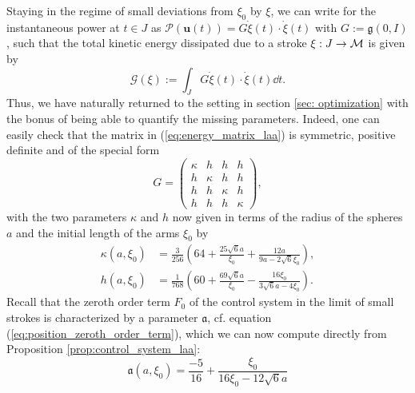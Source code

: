 Staying in the regime of small deviations from $\xi_0$ by $\xi$, we can write for the instantaneous power at $t \in J$ as $\mathcal{P}(\boldsymbol u(t)) = G \dot{\xi}(t) \cdot \dot{\xi}(t)$ with $G := \mathfrak{g}(0, I)$, such that the total kinetic energy dissipated due to a stroke $\xi: J \to \mathcal{M}$ is given by
\begin{equation}
	\mathcal{G}(\xi) := \int_{J} G \dot{\xi}(t) \cdot \dot{\xi}(t) \dd t.
\end{equation}
Thus, we have naturally returned to the setting in section \ref{sec: optimization} with the bonus of being able to quantify the missing parameters. Indeed, one can easily check that the matrix in (\ref{eq:energy_matrix_laa}) is symmetric, positive definite and of the special form
\begin{equation}
G = \left ( \begin{array}{cccc}
\kappa & h & h & h \\ 
h & \kappa & h & h \\ 
h & h & \kappa & h \\ 
h & h & h & \kappa
\end{array} \right ),
\end{equation}
with the two parameters $\kappa$ and $h$ now given in terms of the radius of the spheres $a$ and the initial length of the arms $\xi_0$ by
\begin{eqnarray}
\kappa(a, \xi_0) &= \frac{3}{256} \left ( 64 + \frac{25 \sqrt{6} a}{\xi_0} + \frac{12 a}{9 a - 2 \sqrt{6} \xi_0} \right ),\\
h(a, \xi_0)  &= \frac{1}{768} \left (60 + \frac{69 \sqrt{6} a}{\xi_0} - \frac{16 \xi_0}{3 \sqrt{6} a - 4 \xi_0}  \right ).
\end{eqnarray}
Recall that the zeroth order term $F_0$ of the control system in the limit of small strokes is characterized by a parameter $\mathfrak{a}$, cf. equation (\ref{eq:position_zeroth_order_term}), which we can now compute directly from Proposition \ref{prop:control_system_laa}:
\begin{equation}
\mathfrak{a}(a, \xi_0) = \frac{-5}{16} + \frac{\xi_0}{16 \xi_0 - 12 \sqrt{6} a}
\end{equation}



